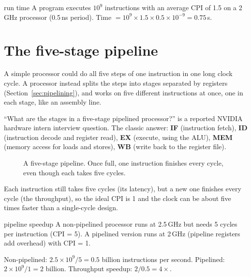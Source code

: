 \begin{worked}{run time}
A program executes $10^9$ instructions with an average CPI of 1.5 on a 2\,GHz processor (0.5\,ns period). Time $= 10^9 \times 1.5 \times 0.5\times10^{-9} = 0.75$\,s.
\end{worked}

\section{The five-stage pipeline}

A simple processor could do all five steps of one instruction in one long clock cycle. A  processor instead splits the steps into stages separated by registers (Section~\ref{sec:pipelining}), and works on five different instructions at once, one in each stage, like an assembly line.

\begin{onoa}
``What are the stages in a five-stage pipelined processor?'' is a reported NVIDIA hardware intern interview question. The classic answer: \textbf{IF} (instruction fetch), \textbf{ID} (instruction decode and register read), \textbf{EX} (execute, using the ALU), \textbf{MEM} (memory access for loads and stores), \textbf{WB} (write back to the register file).
\end{onoa}

\begin{figure}[h]
\centering
{}
\caption{A five-stage pipeline. Once full, one instruction finishes every cycle, even though each takes five cycles.}
\label{fig:pipeline}
\end{figure}

Each instruction still takes five cycles (its latency), but a new one finishes every cycle (the throughput), so the ideal CPI is 1 and the clock can be about five times faster than a single-cycle design.

\begin{worked}{pipeline speedup}
A non-pipelined processor runs at 2.5\,GHz but needs 5 cycles per instruction (CPI = 5). A pipelined version runs at 2\,GHz (pipeline registers add overhead) with CPI = 1.

Non-pipelined: $2.5\times10^9/5 = 0.5$ billion instructions per second. Pipelined: $2\times10^9/1 = 2$ billion. Throughput speedup: $2/0.5 = 4\times$.
\end{worked}

